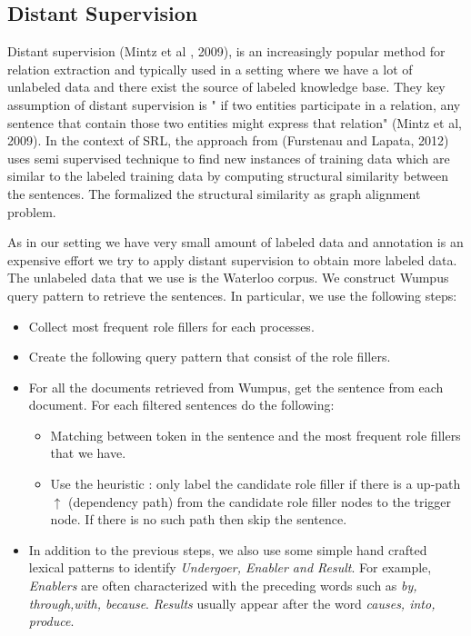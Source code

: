 
\subsection{Distant Supervision}
Distant supervision (Mintz et al , 2009),  is an increasingly popular method for relation extraction and typically used in a setting where we have a lot  of unlabeled data and there exist the source of  labeled knowledge base.
They key assumption of distant supervision is " if two entities participate in a relation, any sentence that contain those two entities might express that relation" (Mintz et al, 2009).  In the context of SRL, the approach from (Furstenau and Lapata, 2012) uses semi supervised technique to find new instances of training data which are similar to the labeled training data by computing structural similarity between the sentences. The formalized the structural similarity  as graph alignment problem.

As in our setting we have very small amount of labeled data and annotation is an expensive effort we try to apply distant supervision to obtain more labeled data. The unlabeled data that we use is the Waterloo corpus. We construct Wumpus query pattern to retrieve the sentences. In particular, we use the following steps:
\begin{itemize}[noitemsep,nolistsep]
\item Collect most frequent role fillers for each processes. 
\item Create the following query pattern that consist of the role fillers.
\item For all the documents retrieved from Wumpus, get the sentence from each document.  For each filtered sentences do the following:
\begin{itemize}[noitemsep,nolistsep]
	\item Matching between token in the sentence and the most frequent role fillers that we have. 
	\item Use the heuristic : only label the candidate role filler if there is a   up-path $\uparrow$ (dependency path) from the candidate role filler nodes to the trigger node. If there is no such path then skip the sentence.
\end{itemize}
\item In addition to the previous steps, we also use some simple hand crafted  lexical patterns  to identify \textit{Undergoer, Enabler and Result}.   For example, \textit{Enablers} are often characterized with the preceding words such as \textit{by, through,with, because}. \textit{Results} usually appear after the word \textit{causes, into, produce}. 
\end{itemize}